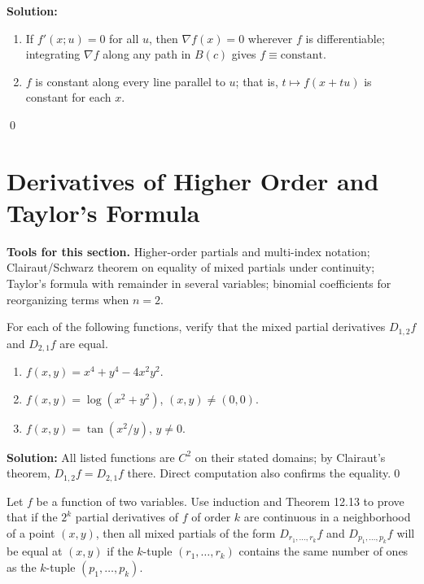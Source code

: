 \noindent\textbf{Solution:}
\begin{enumerate}[label=(\alph*)]
\item If $f'(x;u)=0$ for all $u$, then $\nabla f(x)=0$ wherever $f$ is differentiable; integrating $\nabla f$ along any path in $B(c)$ gives $f\equiv\text{constant}$.
\item $f$ is constant along every line parallel to $u$; that is, $t\mapsto f(x+tu)$ is constant for each $x$.
\end{enumerate}\qed
\section{Derivatives of Higher Order and Taylor's Formula}

\noindent\textbf{Tools for this section.} Higher-order partials and multi-index notation; Clairaut/Schwarz theorem on equality of mixed partials under continuity; Taylor's formula with remainder in several variables; binomial coefficients for reorganizing terms when $n=2$.



\begin{problembox}
For each of the following functions, verify that the mixed partial derivatives \( D_{1,2}f \) and \( D_{2,1}f \) are equal.
\begin{enumerate}[label=(\alph*)]
\item \( f(x, y) = x^4 + y^4 - 4x^2y^2 \).
\item \( f(x, y) = \log (x^2 + y^2) \), \( (x, y) \neq (0, 0) \).
\item \( f(x, y) = \tan (x^2/y) \), \( y \neq 0 \).
\end{enumerate}
\end{problembox}

\noindent\textbf{Solution:}
All listed functions are $C^2$ on their stated domains; by Clairaut's theorem, $D_{1,2}f=D_{2,1}f$ there. Direct computation also confirms the equality.\qed


\begin{problembox}
Let \( f \) be a function of two variables. Use induction and Theorem 12.13 to prove that if the \( 2^k \) partial derivatives of \( f \) of order \( k \) are continuous in a neighborhood of a point \( (x, y) \), then all mixed partials of the form \( D_{r_1, \ldots, r_k} f \) and \( D_{p_1, \ldots, p_k} f \) will be equal at \( (x, y) \) if the \( k \)-tuple \( (r_1, \ldots, r_k) \) contains the same number of ones as the \( k \)-tuple \( (p_1, \ldots, p_k) \).
\end{problembox}

